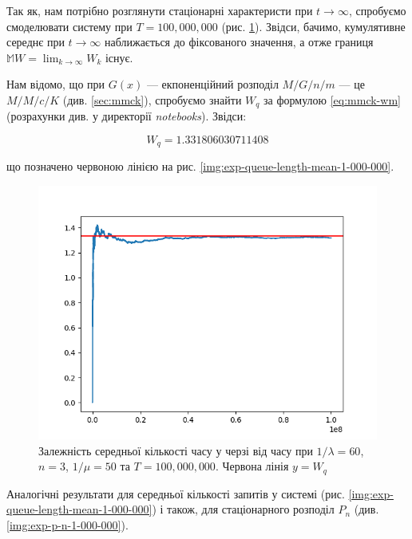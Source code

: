 \documentclass[14pt]{extarticle}
\begin{document}
Так як, нам потрібно розглянути стаціонарні характеристи при \(t \to \infty\),
спробуємо смоделювати систему при \(T = 100,000,000\) (рис.
\ref{img:exp-wait-time--mean-1-000-000}). Звідси, бачимо, кумулятивне середнє при
\(t \to \infty\) наближається до фіксованого значення, а отже границя
\(\mathbb{M} W = \lim_{k \to \infty} W_k \) існує.

Нам відомо, що при \(G(x)\) --- екпоненційний розподіл \(M/G/n/m\) --- це
\(M/M/c/K\) (див. \ref{sec:mmck}), спробуємо знайти \(W_q\) за формулою
\eqref{eq:mmck-wm} (розрахунки див. \cite{Baybula_Analyze_on_PC_2023} у
директорії \textit{notebooks}). Звідси:

\begin{equation*}
  W_{q} = 1.331806030711408
\end{equation*}

що позначено червоною лінією на рис. \ref{img:exp-queue-length-mean-1-000-000}.

\begin{figure}[h!]
  \centering
  \includegraphics{1_000_000_seconds-waiting_mean.png}\caption{{Залежність
      середньої кількості часу у черзі від часу при \(1/\lambda = 60\), \(n = 3\),
      \(1/\mu = 50\) та \(T = 100,000,000\). Червона лінія
      \(y = W_{q}\)}}\label{img:exp-wait-time--mean-1-000-000}
\end{figure}

Аналогічні результати для середньої кількості запитів у системі (рис.
\ref{img:exp-queue-length-mean-1-000-000}) і також, для стаціонарного розподіл
\(P_{n}\) (див. \ref{img:exp-p-n-1-000-000}).
\end{document}
